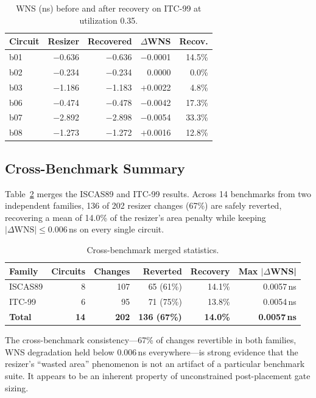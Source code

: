 \documentclass[journal]{IEEEtran}
\begin{document}
\begin{table}[t]
\centering
\caption{WNS (ns) before and after recovery on ITC-99 at utilization 0.35.}
\label{tab:wns_itc}
\renewcommand{\arraystretch}{1.1}
\begin{tabular}{lrrrr}
\toprule
Circuit & Resizer & Recovered & $\Delta$WNS & Recov. \\
\midrule
b01 & $-$0.636 & $-$0.636 & $-$0.0001 & 14.5\% \\
b02 & $-$0.234 & $-$0.234 &  \hphantom{$-$}0.0000 &  0.0\% \\
b03 & $-$1.186 & $-$1.183 & $+$0.0022 &  4.8\% \\
b06 & $-$0.474 & $-$0.478 & $-$0.0042 & 17.3\% \\
b07 & $-$2.892 & $-$2.898 & $-$0.0054 & 33.3\% \\
b08 & $-$1.273 & $-$1.272 & $+$0.0016 & 12.8\% \\
\bottomrule
\end{tabular}
\end{table}

\subsection{Cross-Benchmark Summary}

Table~\ref{tab:cross} merges the ISCAS89 and ITC-99 results. Across
14 benchmarks from two independent families, 136 of 202 resizer changes
(67\%) are safely reverted, recovering a mean of 14.0\% of the resizer's
area penalty while keeping $|\Delta\text{WNS}| \le 0.006$\,ns on every
single circuit.

\begin{table}[t]
\centering
\caption{Cross-benchmark merged statistics.}
\label{tab:cross}
\renewcommand{\arraystretch}{1.1}
\begin{tabular}{lrrrrr}
\toprule
Family & Circuits & Changes & Reverted & Recovery & Max $|\Delta$WNS| \\
\midrule
ISCAS89 & 8 & 107 &  65 (61\%) & 14.1\% & 0.0057\,ns \\
ITC-99  & 6 &  95 &  71 (75\%) & 13.8\% & 0.0054\,ns \\
\midrule
\textbf{Total} & \textbf{14} & \textbf{202} & \textbf{136 (67\%)} & \textbf{14.0\%} & \textbf{0.0057\,ns} \\
\bottomrule
\end{tabular}
\end{table}

The cross-benchmark consistency---67\% of changes revertible in both
families, WNS degradation held below 0.006\,ns everywhere---is strong
evidence that the resizer's ``wasted area'' phenomenon is not an artifact
of a particular benchmark suite. It appears to be an inherent property
of unconstrained post-placement gate sizing.
\end{document}
